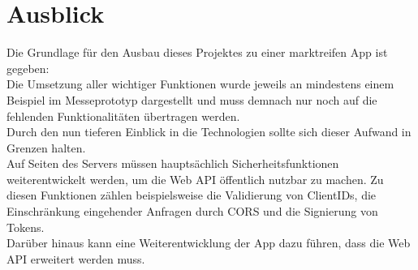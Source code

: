 \section{Ausblick}
\label{sec:ausblick}
Die Grundlage für den Ausbau dieses Projektes zu einer marktreifen \gls{App} ist gegeben: \\
Die Umsetzung aller wichtiger Funktionen wurde jeweils an mindestens einem Beispiel im Messeprototyp dargestellt und muss demnach nur noch auf die fehlenden Funktionalitäten übertragen werden.\\
Durch den nun tieferen Einblick in die Technologien sollte sich dieser Aufwand in Grenzen halten.\\
Auf Seiten des Servers müssen hauptsächlich Sicherheitsfunktionen weiterentwickelt werden, um die Web API öffentlich nutzbar zu machen. Zu diesen Funktionen zählen beispielsweise die Validierung von ClientIDs, die Einschränkung eingehender Anfragen durch \ac{CORS} und die Signierung von Tokens. \\
Darüber hinaus kann eine Weiterentwicklung der \gls{App} dazu führen, dass die Web \ac{API} erweitert werden muss. 